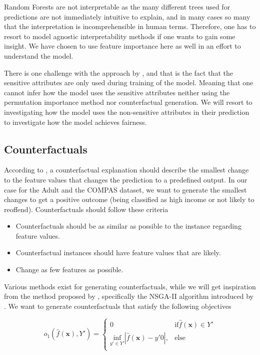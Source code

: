 Random Forests are not interpretable as the many different trees used for predictions are not immediately intuitive to explain, and in many cases so many that the interpretation is incomprehensible in human terms. Therefore, one has to resort to model agnostic interpretability methods if one wants to gain some insight. We have chosen to use feature importance here as well in an effort to understand the model.

There is one challenge with the approach by \citet{Antonio:2021:arXiv}, and that is the fact that the sensitive attributes are only used during training of the model. Meaning that one cannot infer how the model uses the sensitive attributes neither using the permutation importance method nor counterfactual generation. We will resort to investigating how the model uses the non-sensitive attributes in their prediction to investigate how the model achieves fairness.

\subsection{Counterfactuals}
\label{sec:counterfactuals}

According to \citet{Molnar:2020:Book}, a counterfactual explanation should describe the smallest change to the feature values that changes the prediction to a predefined output. In our case for the Adult and the COMPAS dataset, we want to generate the smallest changes to get a positive outcome (being classified as high income or not likely to reoffend). Counterfactuals should follow these criteria

\begin{itemize}
    \item Counterfactuals should be as similar as possible to the instance regarding feature values.
    \item Counterfactual instances should have feature values that are likely.
    \item Change as few features as possible.
\end{itemize}

Various methods exist for generating counterfactuals, while we will get inspiration from the method proposed by \citet{Dandl:2020:PPSN}, specifically the NSGA-II algorithm introduced by \citet{Pratap:2002:IEEE.Trans.Evol.Comput.}. We want to generate counterfactuals that satisfy the following objectives 

\begin{equation*}
    o_1(\hat{f}(\boldsymbol{x}), Y') = 
    \begin{cases}
        0 & \text{if} \hat{f}(\boldsymbol{x}) \in Y' \\
        \underset{y' \in Y'}{\text{inf}} |\hat{f}(\boldsymbol{x}) - y'0|, & \text{else} \\
    \end{cases}
\end{equation*}


